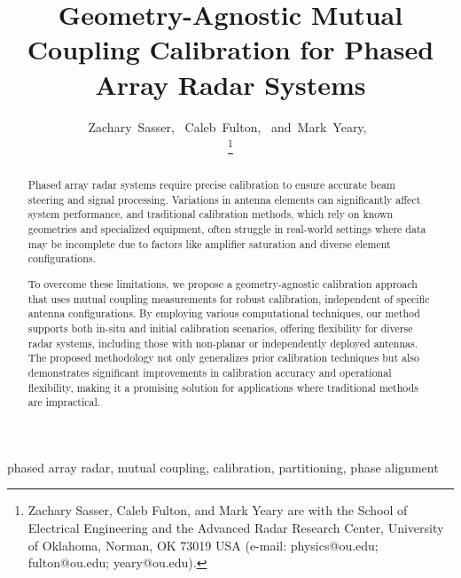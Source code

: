 \documentclass[journal]{IEEEtran}
\begin{document}
\title{Geometry-Agnostic Mutual Coupling Calibration for Phased Array Radar Systems}

\author{Zachary~Sasser,~
        Caleb~Fulton,~
        and~Mark~Yeary,~\\
\thanks{Zachary Sasser, Caleb Fulton, and Mark Yeary are with the School of Electrical Engineering and the Advanced Radar Research Center, University of Oklahoma, Norman, OK 73019 USA (e-mail: physics@ou.edu; fulton@ou.edu; yeary@ou.edu).}%
}

\maketitle


\begin{abstract}
Phased array radar systems require precise calibration to ensure accurate beam steering and signal processing. Variations in antenna elements can significantly affect system performance, and traditional calibration methods, which rely on known geometries and specialized equipment, often struggle in real-world settings where data may be incomplete due to factors like amplifier saturation and diverse element configurations.

To overcome these limitations, we propose a geometry-agnostic calibration approach that uses mutual coupling measurements for robust calibration, independent of specific antenna configurations. By employing various computational techniques, our method supports both in-situ and initial calibration scenarios, offering flexibility for diverse radar systems, including those with non-planar or independently deployed antennas. The proposed methodology not only generalizes prior calibration techniques but also demonstrates significant improvements in calibration accuracy and operational flexibility, making it a promising solution for applications where traditional methods are impractical.
\end{abstract}

\begin{IEEEkeywords}
phased array radar, mutual coupling, calibration, partitioning, phase alignment
\end{IEEEkeywords}


\end{document}

